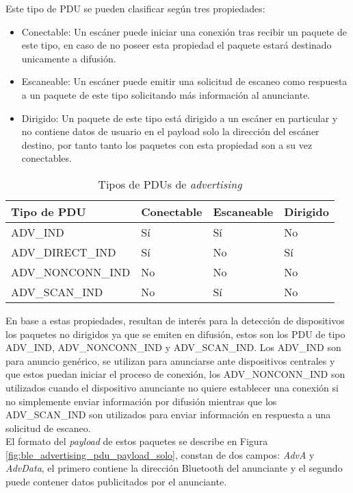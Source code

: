 \documentclass[../proyecto.tex]{subfiles}
\begin{document}
Este tipo de PDU se pueden clasificar según tres propiedades:

\begin{itemize}
  \item Conectable: Un escáner puede iniciar una conexión tras recibir un paquete de este tipo, en caso de no poseer esta propiedad el paquete estará destinado unicamente a difusión.
  \item Escaneable: Un escáner puede emitir una solicitud de escaneo como respuesta a un paquete de este tipo solicitando más información al anunciante.
  \item Dirigido: Un paquete de este tipo está dirigido a un escáner en particular y no contiene datos de usuario en el payload solo la dirección del escáner destino, por tanto tanto los paquetes con esta propiedad son a su vez conectables.
\end{itemize}

\begin{table}[h!]
\centering
\begin{tabular}{ |l|l|l|l| }
\hline
\textbf{Tipo de PDU} & \textbf{Conectable} & \textbf{Escaneable} & \textbf{Dirigido} \\
\hline\hline
ADV\_IND  & Sí  & Sí & No \\ \hline
ADV\_DIRECT\_IND  & Sí & No & Sí \\ \hline
ADV\_NONCONN\_IND  & No & No & No \\ \hline
ADV\_SCAN\_IND &  No& Sí & No \\ \hline
\end{tabular}
\caption{Tipos de PDUs de \textit{advertising}}
\label{table:advertising_pdu_type}
\end{table}

En base a estas propiedades, resultan de interés para la detección de dispositivos los paquetes no dirigidos ya que se emiten en difusión, estos son los PDU de tipo ADV\_IND, ADV\_NONCONN\_IND y ADV\_SCAN\_IND. Los ADV\_IND son para anuncio genérico, se utilizan para anunciarse ante dispositivos centrales y que estos puedan iniciar el proceso de conexión, los ADV\_NONCONN\_IND son utilizados cuando el dispositivo anunciante no quiere establecer una conexión si no simplemente enviar información por difusión mientras que los ADV\_SCAN\_IND son utilizados para enviar información en respuesta a una solicitud de escaneo.\\

El formato del \textit{payload} de estos paquetes se describe en Figura \ref{fig:ble_advertising_pdu_payload_solo}, constan de dos campos: \textit{AdvA} y \textit{AdvData}, el primero contiene la dirección Bluetooth del anunciante y el segundo puede contener datos publicitados por el anunciante.\\
\end{document}
